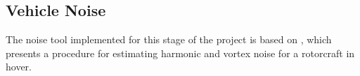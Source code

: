 \subsection{Vehicle Noise}

The noise tool implemented for this stage of the project is based on \cite{Brown2018}, which presents a procedure for estimating harmonic and vortex noise for a rotorcraft in hover.




